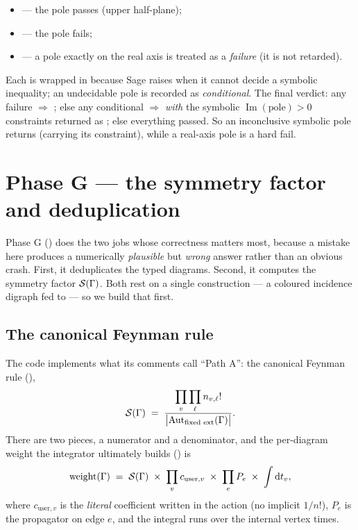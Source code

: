\begin{itemize}
  \item {} --- the pole passes (upper half-plane);
  \item {} --- the pole fails;
  \item {} --- a pole exactly on the real axis is
        treated as a \emph{failure} (it is not retarded).
\end{itemize}

Each  is wrapped in 
because Sage raises when it cannot decide a symbolic inequality; an undecidable
pole is recorded as \emph{conditional}. The final verdict: any failure
$\Rightarrow$ ; else any conditional $\Rightarrow$ 
\emph{with} the symbolic $\operatorname{Im}(\text{pole}) > 0$ constraints returned
as ; else everything passed. So an inconclusive symbolic pole
returns  (carrying its constraint), while a real-axis pole is a
hard fail.

\section{Phase G --- the symmetry factor and deduplication}\label{sec:ta-symmetry}

Phase G () does the two jobs whose
correctness matters most, because a mistake here produces a numerically
\emph{plausible} but \emph{wrong} answer rather than an obvious crash. First, it
deduplicates the typed diagrams. Second, it computes the symmetry factor
$\mathcal{S}(\Gamma)$. Both rest on a single construction --- a coloured incidence
digraph fed to  --- so we build that first.

\subsection{The canonical Feynman rule}

The code implements what its comments call ``Path A'': the canonical Feynman
rule (),
\begin{equation}
  \mathcal{S}(\Gamma) \;=\;
  \frac{\displaystyle\prod_v \prod_\ell n_{v,\ell}!}
       {\bigl|\mathrm{Aut}_{\text{fixed ext}}(\Gamma)\bigr|}.
  \label{eq:ta-sym}
\end{equation}
There are two pieces, a numerator and a denominator, and the per-diagram weight
the integrator ultimately builds () is
\begin{equation}
  \mathrm{weight}(\Gamma) \;=\;
  \mathcal{S}(\Gamma)\;\times\;\prod_v c_{\text{user},v}\;\times\;\prod_e P_e
  \;\times\;\int \mathrm{d} t_v,
  \label{eq:ta-weight}
\end{equation}
where $c_{\text{user},v}$ is the \emph{literal} coefficient written in the action
(no implicit $1/n!$), $P_e$ is the propagator on edge $e$, and the integral runs
over the internal vertex times.

